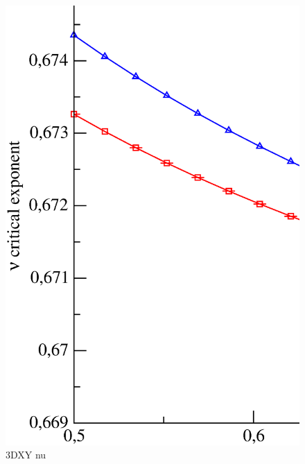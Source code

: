 \begin{figure}[!htpb]
  \centering
  \includegraphics[width=\textwidth]{./plots/3DXY/vsO/nu.eps}
  \caption{3DXY nu}
\end{figure}

